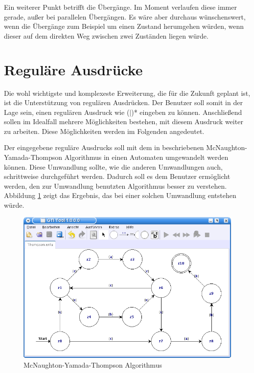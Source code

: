 Ein weiterer Punkt betrifft die Übergänge. Im Moment verlaufen diese immer
gerade, außer bei parallelen Übergängen. Es wäre aber durchaus wünschenswert,
wenn die Übergänge zum Beispiel um einen Zustand herumgehen würden, wenn dieser
auf dem direkten Weg zwischen zwei Zuständen liegen würde.\vspace{10pt}


\section{Reguläre Ausdrücke}\label{PerspectiveRegEx}

Die wohl wichtigste und komplexeste Erweiterung, die für die Zukunft geplant ist,
ist die Unterstützung von regulären Ausdrücken. Der Benutzer soll somit in der
Lage sein, einen regulären Ausdruck wie
($\mid$)* eingeben zu können.
Anschließend sollen im Idealfall mehrere Möglichkeiten bestehen, mit diesem
Ausdruck weiter zu arbeiten. Diese Möglichkeiten werden im Folgenden
angedeutet.\vspace{10pt}

Der eingegebene reguläre Ausdrucks soll mit dem in \cite[S.159ff]{Compilers}
beschriebenen McNaughton-Yamada-Thompson Algorithmus in einen Automaten
umgewandelt werden können. Diese Umwandlung sollte, wie die anderen Umwandlungen
auch, schrittweise durchgeführt werden. Dadurch soll es dem Benutzer ermöglicht
werden, den zur Umwandlung benutzten Algorithmus besser zu verstehen. Abbildung
\ref{FigureThompson} zeigt das Ergebnis, das bei einer solchen Umwandlung
entstehen würde.\vspace{10pt}

\begin{figure}[h!]
\begin{center}
\includegraphics[width=12cm]{../images/thompson.png}
\caption{McNaughton-Yamada-Thompson Algorithmus}
\label{FigureThompson}
\end{center}
\end{figure}
\vspace{10pt}

